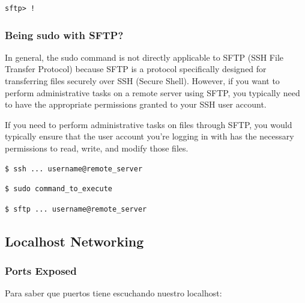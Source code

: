 \documentclass{article}
\newenvironment{codetemplate}[1][]{%
  \mybasecolorbox[#1]
  \itshape
}{%
  \endmybasecolorbox
}
\begin{document}
\begin{codetemplate}{}
\begin{verbatim}
sftp> !
\end{verbatim}
\end{codetemplate}

\subsubsection{Being sudo with SFTP?}
In general, the sudo command is not directly applicable to SFTP (SSH File Transfer Protocol) because SFTP is a protocol specifically designed for transferring files securely over SSH (Secure Shell). However, if you want to perform administrative tasks on a remote server using SFTP, you typically need to have the appropriate permissions granted to your SSH user account.

If you need to perform administrative tasks on files through SFTP, you would typically ensure that the user account you're logging in with has the necessary permissions to read, write, and modify those files. 

\begin{codetemplate}{}
\begin{verbatim}
$ ssh ... username@remote_server
\end{verbatim}
\end{codetemplate}

\begin{codetemplate}{}
\begin{verbatim}
$ sudo command_to_execute
\end{verbatim}
\end{codetemplate}

\begin{codetemplate}{}
\begin{verbatim}
$ sftp ... username@remote_server
\end{verbatim}
\end{codetemplate}

\subsection{Localhost Networking}
\subsubsection{Ports Exposed}

Para saber que puertos tiene escuchando nuestro localhost:
\end{document}
